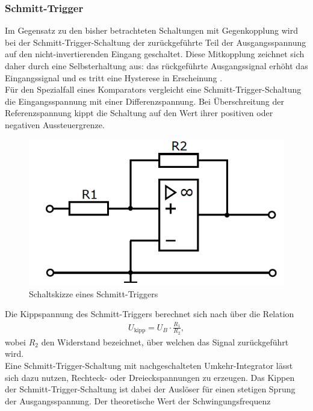 \subsubsection{Schmitt-Trigger}
\noindent Im Gegensatz zu den bisher betrachteten Schaltungen mit Gegenkopplung
wird bei der Schmitt-Trigger-Schaltung der zurückgeführte Teil der
Ausgangsspannung auf den nicht-invertierenden Eingang geschaltet. Diese Mitkopplung
zeichnet sich daher durch eine Selbsterhaltung aus: das rückgeführte
Ausgangssignal erhöht das Eingangssignal und es tritt eine Hysterese in
Erscheinung \cite{elektrotechnik}. \\
Für den Spezialfall eines Komparators vergleicht eine
Schmitt-Trigger-Schaltung die Eingangsspannung mit einer Differenzspannung.
Bei Überschreitung der Referenzspannung kippt die Schaltung auf den Wert ihrer
positiven oder negativen Aussteuergrenze.
\FloatBarrier
\begin{figure}
  \centering
  \includegraphics[scale=0.99]{ressources/figure_06.png}
  \caption{Schaltskizze eines Schmitt-Triggers \cite{sample}}
  \label{fig:06}
\end{figure}
\FloatBarrier
\noindent Die Kippspannung des Schmitt-Triggers berechnet sich nach \cite{federau}
über die Relation
\begin{align}
  U_\text{kipp} = U_B \cdot \frac{R_1}{R_2},
  \label{eqn:09}
\end{align}
wobei $R_2$ den Widerstand bezeichnet, über welchen das Signal zurückgeführt
wird. \\
\noindent Eine Schmitt-Trigger-Schaltung mit nachgeschalteten Umkehr-Integrator
lässt sich dazu nutzen, Rechteck- oder Dreieckspannungen zu erzeugen.
Das Kippen der Schmitt-Trigger-Schaltung ist dabei der Auslöser für einen
stetigen Sprung der Ausgangsspannung. Der theoretische Wert der Schwingungsfrequenz
